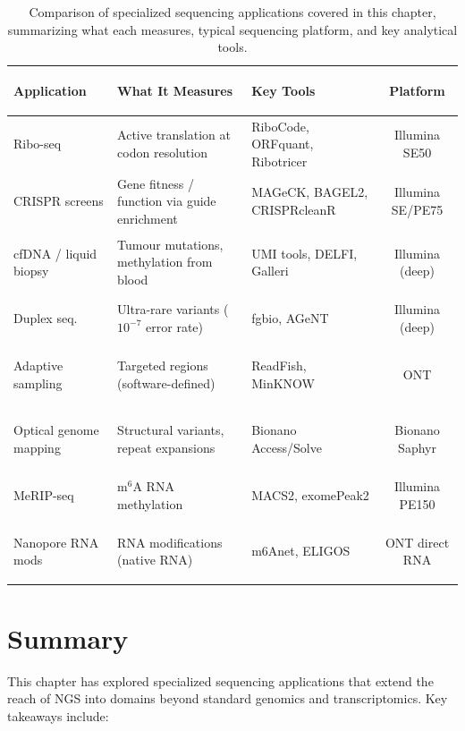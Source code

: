 \begin{table}[htbp]
\centering
\caption[Comparison of specialized sequencing applications.]{Comparison of specialized sequencing applications covered in this chapter, summarizing what each measures, typical sequencing platform, and key analytical tools.}
\label{tab:specialized:comparison}
\small
\begin{tabularx}{\textwidth}{>{\bfseries\raggedright}p{2.2cm} X X c}
\toprule
\textbf{Application} & \textbf{What It Measures} & \textbf{Key Tools} & \textbf{Platform} \\
\midrule
Ribo-seq & Active translation at codon resolution & RiboCode, ORFquant, Ribotricer & Illumina SE50 \\
\addlinespace
CRISPR screens & Gene fitness / function via guide enrichment & MAGeCK, BAGEL2, CRISPRcleanR & Illumina SE/PE75 \\
\addlinespace
cfDNA / liquid biopsy & Tumour mutations, methylation from blood & UMI tools, DELFI, Galleri & Illumina (deep) \\
\addlinespace
Duplex seq. & Ultra-rare variants ($10^{-7}$ error rate) & fgbio, AGeNT & Illumina (deep) \\
\addlinespace
Adaptive sampling & Targeted regions (software-defined) & ReadFish, MinKNOW & ONT \\
\addlinespace
Optical genome mapping & Structural variants, repeat expansions & Bionano Access/Solve & Bionano Saphyr \\
\addlinespace
MeRIP-seq & m$^6$A RNA methylation & MACS2, exomePeak2 & Illumina PE150 \\
\addlinespace
Nanopore RNA mods & RNA modifications (native RNA) & m6Anet, ELIGOS & ONT direct RNA \\
\bottomrule
\end{tabularx}
\end{table}


\section{Summary}
\label{sec:specialized:summary}

This chapter has explored specialized sequencing applications that extend the reach of NGS into domains beyond standard genomics and transcriptomics. Key takeaways include:

